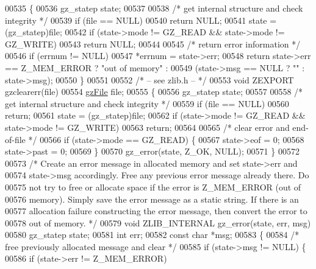 \begin{DoxyCode}
{{{{00535 \{
00536     gz\_statep state;
00537 
00538     \textcolor{comment}{/* get internal structure and check integrity */}
00539     \textcolor{keywordflow}{if} (file == NULL)
00540         \textcolor{keywordflow}{return} NULL;
00541     state = (gz\_statep)file;
00542     \textcolor{keywordflow}{if} (state->mode != GZ\_READ && state->mode != GZ\_WRITE)
00543         \textcolor{keywordflow}{return} NULL;
00544 
00545     \textcolor{comment}{/* return error information */}
00546     \textcolor{keywordflow}{if} (errnum != NULL)
00547         *errnum = state->err;
00548     \textcolor{keywordflow}{return} state->err == Z\_MEM\_ERROR ? \textcolor{stringliteral}{"out of memory"} :
00549                                        (state->msg == NULL ? \textcolor{stringliteral}{""} : state->msg);
00550 \}
00551 
00552 \textcolor{comment}{/* -- see zlib.h -- */}
00553 \textcolor{keywordtype}{void} ZEXPORT gzclearerr(file)
00554     \hyperlink{structgz_file__s}{gzFile} file;
00555 \{
00556     gz\_statep state;
00557 
00558     \textcolor{comment}{/* get internal structure and check integrity */}
00559     \textcolor{keywordflow}{if} (file == NULL)
00560         \textcolor{keywordflow}{return};
00561     state = (gz\_statep)file;
00562     \textcolor{keywordflow}{if} (state->mode != GZ\_READ && state->mode != GZ\_WRITE)
00563         \textcolor{keywordflow}{return};
00564 
00565     \textcolor{comment}{/* clear error and end-of-file */}
00566     \textcolor{keywordflow}{if} (state->mode == GZ\_READ) \{
00567         state->eof = 0;
00568         state->past = 0;
00569     \}
00570     gz\_error(state, Z\_OK, NULL);
00571 \}
00572 
00573 \textcolor{comment}{/* Create an error message in allocated memory and set state->err and}
00574 \textcolor{comment}{   state->msg accordingly.  Free any previous error message already there.  Do}
00575 \textcolor{comment}{   not try to free or allocate space if the error is Z\_MEM\_ERROR (out of}
00576 \textcolor{comment}{   memory).  Simply save the error message as a static string.  If there is an}
00577 \textcolor{comment}{   allocation failure constructing the error message, then convert the error to}
00578 \textcolor{comment}{   out of memory. */}
00579 \textcolor{keywordtype}{void} ZLIB\_INTERNAL gz\_error(state, err, msg)
00580     gz\_statep state;
00581     \textcolor{keywordtype}{int} err;
00582     \textcolor{keyword}{const} \textcolor{keywordtype}{char} *msg;
00583 \{
00584     \textcolor{comment}{/* free previously allocated message and clear */}
00585     \textcolor{keywordflow}{if} (state->msg != NULL) \{
00586         \textcolor{keywordflow}{if} (state->err != Z\_MEM\_ERROR)
}}}}
\end{DoxyCode}
